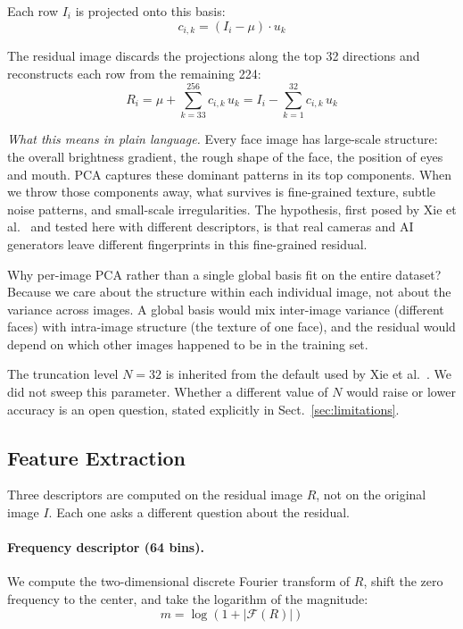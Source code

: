\documentclass[runningheads]{llncs}
\begin{document}
Each row $I_i$ is projected onto this basis:
\begin{equation}
c_{i,k} = (I_i - \mu) \cdot u_k
\label{eq:projection}
\end{equation}

The residual image discards the projections along the top 32 directions and reconstructs each row from the remaining 224:
\begin{equation}
R_i = \mu + \sum_{k=33}^{256} c_{i,k}\, u_k = I_i - \sum_{k=1}^{32} c_{i,k}\, u_k
\label{eq:residual}
\end{equation}

\textit{What this means in plain language.} Every face image has large-scale structure: the overall brightness gradient, the rough shape of the face, the position of eyes and mouth. PCA captures these dominant patterns in its top components. When we throw those components away, what survives is fine-grained texture, subtle noise patterns, and small-scale irregularities. The hypothesis, first posed by Xie et al.~\cite{xie2026} and tested here with different descriptors, is that real cameras and AI generators leave different fingerprints in this fine-grained residual.

Why per-image PCA rather than a single global basis fit on the entire dataset? Because we care about the structure within each individual image, not about the variance across images. A global basis would mix inter-image variance (different faces) with intra-image structure (the texture of one face), and the residual would depend on which other images happened to be in the training set.

The truncation level $N = 32$ is inherited from the default used by Xie et al.~\cite{xie2026}. We did not sweep this parameter. Whether a different value of $N$ would raise or lower accuracy is an open question, stated explicitly in Sect.~\ref{sec:limitations}.


\subsection{Feature Extraction}

Three descriptors are computed on the residual image $R$, not on the original image $I$. Each one asks a different question about the residual.

\paragraph{Frequency descriptor (64 bins).} We compute the two-dimensional discrete Fourier transform of $R$, shift the zero frequency to the center, and take the logarithm of the magnitude:
\begin{equation}
m = \log(1 + |\mathcal{F}(R)|)
\label{eq:fft}
\end{equation}
\end{document}
